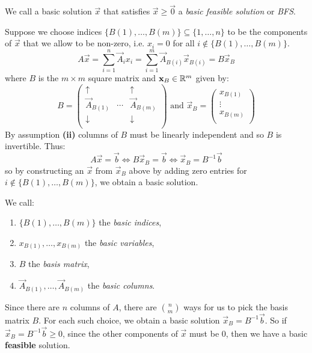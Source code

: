 \documentclass[../main.tex]{subfiles}
\begin{document}
\begin{definition}
  We call a basic solution $\vec{x}$ that satisfies $\vec{x} \geq \vec{0}$ a \textit{basic feasible solution} or \textit{BFS}.
\end{definition}
Suppose we choose indices $\{B(1), \ldots, B(m)\} \subseteq \{1, \ldots, n\}$ to be the components of $\vec{x}$ that we allow to be non-zero, i.e. $x_i = 0$ for all $i \notin \{B(1), \ldots, B(m)\}$.
\[
  A \vec{x} = \sum_{i = 1}^{n} \vec{A}_i x_i = \sum_{i = 1}^{m} \vec{A}_{B(i)}\vec{x}_{B(i)} = B \vec{x}_{B}
\]
where $B$ is the $m \times m$ square matrix and $\mathbf{\bm{x}}_B \in \mathbb{R}^{m}$ given by:
\[
  B = \begin{pmatrix}
  \uparrow & & \uparrow  \\
  \vec{A}_{B(1)} & \cdots & \vec{A}_{B(m)}  \\
  \downarrow &  & \downarrow \\
  \end{pmatrix}
 \text{ and } \vec{x}_{B} = \begin{pmatrix}
  x_{B(1)} \\
  \vdots \\
  x_{B(m)} \\
  \end{pmatrix}
\]
By assumption \textbf{(ii)} columns of $B$ must be linearly independent and so $B$ is invertible.
Thus:
\[
  A\vec{x} = \vec{b} \iff B\vec{x}_B = \vec{b} \iff \vec{x}_{B} = B^{-1} \vec{b}
\]
so by constructing an $\vec{x}$ from $\vec{x}_B$ above by adding zero entries for $i \notin \{B(1), \ldots, B(m)\}$, we obtain a basic solution.
\begin{definition}
  We call:
  \begin{enumerate}
    \item $\{B(1), \ldots, B(m)\}$ the \textit{basic indices},
    \item $x_{B(1)}, \ldots, x_{B(m)}$ the \textit{basic variables},
    \item $B$ the \textit{basis matrix},
    \item $\vec{A}_{B(1)}, \ldots, \vec{A}_{B(m)}$ the \textit{basic columns}.
  \end{enumerate}
\end{definition}
Since there are $n$ columns of $A$, there are $\binom{n}{m}$ ways for us to pick the basis matrix $B$.
For each such choice, we obtain a basic solution $\vec{x}_{B} = B^{-1} \vec{b}$.
So if $\vec{x}_B = B^{-1}\vec{b} \geq 0$, since the other components of $\vec{x}$ must be 0, then we have a basic \textbf{feasible} solution.
\end{document}
